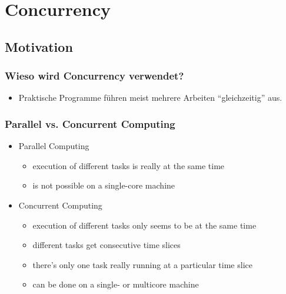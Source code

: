 \section{Concurrency}

\subsection{Motivation}
\subsubsection{Wieso wird Concurrency verwendet?}
\begin{itemize}
  \item Praktische Programme führen meist mehrere Arbeiten "`gleichzeitig"' aus.
\end{itemize}

\subsubsection{Parallel vs. Concurrent Computing}
\begin{itemize}
  \item Parallel Computing
  	\begin{itemize}
  	  \item execution of different tasks is really at the same time
  	  \item is not possible on a single-core machine
  	\end{itemize}
  \item Concurrent Computing
  	\begin{itemize}
  	  \item execution of different tasks only seems to be at the same time
  	  \item different tasks get consecutive time slices
  	  \item there's only one task really running at a particular time slice
  	  \item can be done on a single- or multicore machine
  	\end{itemize}
\end{itemize}

